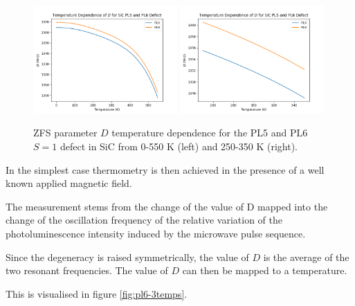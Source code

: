 \begin{figure}[h]
    \begin{center}
    \includegraphics[width=0.49\textwidth]{figures/SiC-PL5PL6-D(T).png}
    \includegraphics[width=0.49\textwidth]{figures/SiC-PL5PL6-D(T)-close.png}
    \caption{ZFS parameter $D$ temperature dependence for the PL5 and PL6 $S=1$ defect in SiC from 0-550 K (left) and 250-350 K (right). }\label{fig:PL5PL6DvsT}
\end{center}
\end{figure}


In the simplest case thermometry is then achieved in the presence of a well known applied magnetic field. 

The measurement stems from the change of the value of
D mapped into the change of the oscillation frequency of the
relative variation of the photoluminescence intensity induced by the microwave pulse sequence.

Since the degeneracy is raised symmetrically, the value of $D$ is the average of the two resonant frequencies. The value of $D$ can then be mapped to a temperature. 

This is visualised in figure \ref{fig:pl6-3temps}. 

